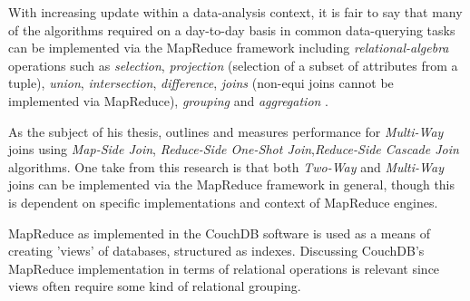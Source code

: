 With increasing update within a data-analysis context, it is fair to say that many of the algorithms required on a day-to-day basis in common data-querying tasks can be implemented via the MapReduce framework including \textit{relational-algebra} operations such as \textit{selection}, \textit{projection} (selection of a subset of attributes from a tuple), \textit{union}, \textit{intersection}, \textit{difference}, \textit{joins} (non-equi joins cannot be implemented via MapReduce), \textit{grouping} and \textit{aggregation} \cite{mining2011}.

As the subject of his thesis, \cite{chandar2010} outlines and measures performance for \textit{Multi-Way} joins using \textit{Map-Side Join}, \textit{Reduce-Side One-Shot Join},\textit{Reduce-Side Cascade Join} algorithms. One take from this research is that both \textit{Two-Way} and \textit{Multi-Way} joins can be implemented via the MapReduce framework in general, though this is dependent on specific implementations and context of MapReduce engines.

MapReduce as implemented in the CouchDB software is used as a means of creating 'views' of databases, structured as indexes. Discussing CouchDB's MapReduce implementation in terms of relational operations is relevant since views often require some kind of relational grouping.